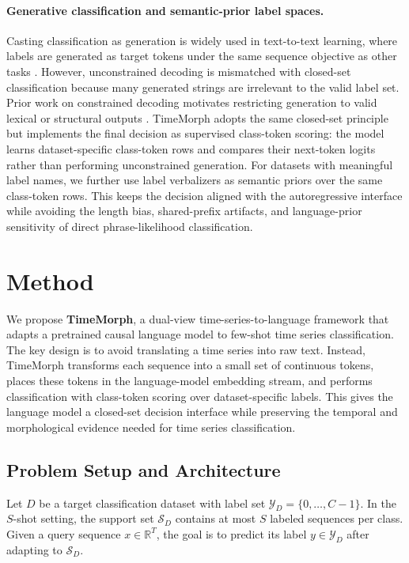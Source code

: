 \documentclass{article}
\begin{document}
\paragraph{Generative classification and semantic-prior label spaces.}
Casting classification as generation is widely used in text-to-text learning, where labels are generated as target tokens under the same sequence objective as other tasks \cite{raffel2020exploring}. However, unconstrained decoding is mismatched with closed-set classification because many generated strings are irrelevant to the valid label set. Prior work on constrained decoding motivates restricting generation to valid lexical or structural outputs \cite{hokamp2017lexically,koo2024automata}. TimeMorph adopts the same closed-set principle but implements the final decision as supervised class-token scoring: the model learns dataset-specific class-token rows and compares their next-token logits rather than performing unconstrained generation. For datasets with meaningful label names, we further use label verbalizers as semantic priors over the same class-token rows. This keeps the decision aligned with the autoregressive interface while avoiding the length bias, shared-prefix artifacts, and language-prior sensitivity of direct phrase-likelihood classification.

\section{Method}
\label{sec:method}

We propose \textbf{TimeMorph}, a dual-view time-series-to-language framework that adapts a pretrained causal language model to few-shot time series classification. The key design is to avoid translating a time series into raw text. Instead, TimeMorph transforms each sequence into a small set of continuous tokens, places these tokens in the language-model embedding stream, and performs classification with class-token scoring over dataset-specific labels. This gives the language model a closed-set decision interface while preserving the temporal and morphological evidence needed for time series classification.

\subsection{Problem Setup and Architecture}
\label{sec:method-overview}

Let $D$ be a target classification dataset with label set
$\mathcal{Y}_D=\{0,\ldots,C-1\}$. In the $S$-shot setting, the support set
$\mathcal{S}_D$ contains at most $S$ labeled sequences per class. Given a query
sequence $x\in\mathbb{R}^{T}$, the goal is to predict its label
$y\in\mathcal{Y}_D$ after adapting to $\mathcal{S}_D$.
\end{document}
